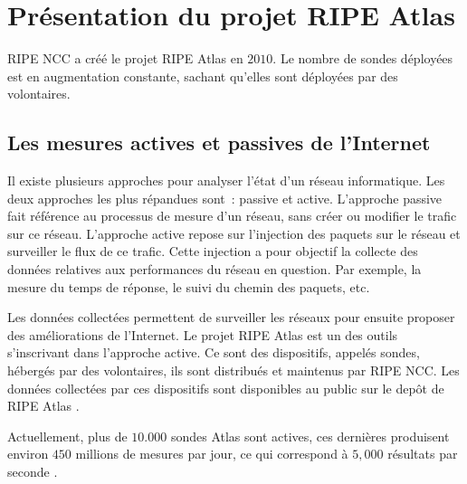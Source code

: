 \section{Présentation du projet RIPE Atlas } \label{ripeatlassection}

RIPE NCC a créé le projet RIPE Atlas en $2010$. Le nombre de sondes déployées est en augmentation constante, sachant qu'elles sont déployées par des volontaires.

\subsection{Les mesures  actives et passives de l'Internet}

Il existe plusieurs approches pour analyser l'état  d'un réseau informatique. Les deux approches les plus répandues sont~:   passive et active. L'approche passive fait référence au processus de mesure d'un réseau, sans créer ou modifier le trafic sur ce réseau.   L'approche active  repose sur l'injection des paquets  sur le réseau et surveiller le flux de ce trafic. Cette injection a pour objectif la collecte  des données relatives aux performances du réseau en question. Par exemple, la mesure du temps de réponse, le suivi du chemin des paquets, etc. 

Les données collectées permettent de surveiller les réseaux pour ensuite  proposer des améliorations de l'Internet. Le projet RIPE Atlas est un des outils s'inscrivant dans l'approche active. Ce sont  des dispositifs, appelés sondes, hébergés par des volontaires, ils sont distribués et maintenus par  RIPE NCC. Les données collectées par ces dispositifs sont disponibles au public sur le depôt de RIPE Atlas \cite{ripe-atlas-data}.

Actuellement,  plus de $10.000$ sondes Atlas sont actives, ces dernières produisent environ $450$ millions de mesures par jour, ce qui correspond à  $5,000$ résultats par seconde \cite{WinNT}.


